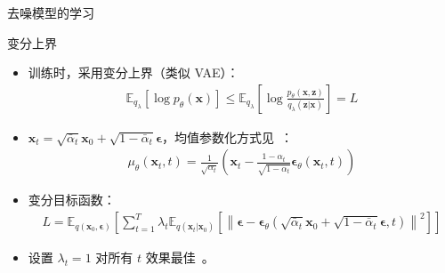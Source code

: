 \begin{refsection}
\begin{frame}{去噪模型的学习}
  \begin{minipage}{1.0\linewidth}
  \centering
  {\color{purple}\scriptsize 变分上界}
  \vspace{0.3em}

  \begin{itemize}
    \setlength\itemsep{0.2em}
    \item {\scriptsize 训练时，采用变分上界（类似 VAE）：}
    {\scriptsize
    \begin{align*}
      \mathbb{E}_{q_\lambda} [ \log p_\theta(\mathbf{x}) ] \leq \mathbb{E}_{q_\lambda} \left[ \log \frac{p_\theta(\mathbf{x}, \mathbf{z})}{q_\lambda(\mathbf{z}|\mathbf{x})} \right] = L
    \end{align*}
    }
    \item {\scriptsize $\mathbf{x}_t = \sqrt{\bar{\alpha}_t} \mathbf{x}_0 + \sqrt{1 - \bar{\alpha}_t} \boldsymbol{\epsilon}$，均值参数化方式见~\parencite{ho2020denoising}：}
    {\scriptsize
    \begin{align*}
      \mu_\theta(\mathbf{x}_t, t) = \frac{1}{\sqrt{\alpha_t}} \left( \mathbf{x}_t - \frac{1 - \alpha_t}{\sqrt{1 - \bar{\alpha}_t}} \boldsymbol{\epsilon}_\theta(\mathbf{x}_t, t) \right)
    \end{align*}
    }
    \item {\scriptsize 变分目标函数：}
    {\scriptsize
    \begin{align*}
      L = \mathbb{E}_{q(\mathbf{x}_0, \boldsymbol{\epsilon})} \left[ \sum_{t=1}^T \lambda_t \mathbb{E}_{q(\mathbf{x}_t|\mathbf{x}_0)} \left[ \left\| \boldsymbol{\epsilon} - \boldsymbol{\epsilon}_\theta(\sqrt{\bar{\alpha}_t} \mathbf{x}_0 + \sqrt{1 - \bar{\alpha}_t} \boldsymbol{\epsilon}, t) \right\|^2 \right] \right]
    \end{align*}
    }
    \item {\scriptsize 设置 $\lambda_t=1$ 对所有 $t$ 效果最佳~\parencite{ho2020denoising}。}
  \end{itemize}
  \end{minipage}
  \vspace{-0.5em}
  \bottomleftrefs
\end{frame}
\end{refsection}

